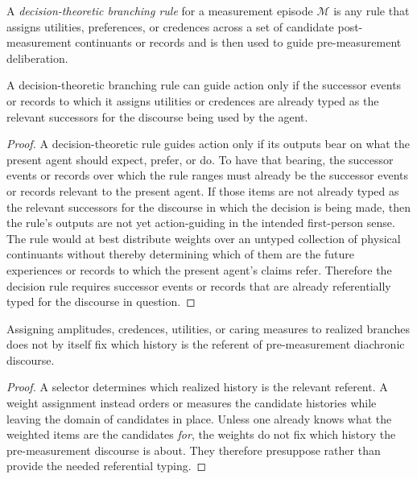 \begin{definition}
A \emph{decision-theoretic branching rule} for a measurement episode $\mathcal{M}$ is any rule that
assigns utilities, preferences, or credences across a set of candidate post-measurement continuants or
records and is then used to guide pre-measurement deliberation.
\end{definition}

\begin{lemma}
\label{lem:typed_successors}
A decision-theoretic branching rule can guide action only if the successor events or records to which it
assigns utilities or credences are already typed as the relevant successors for the discourse being used by
the agent.
\end{lemma}

\begin{proof}
A decision-theoretic rule guides action only if its outputs bear on what the present agent should expect,
prefer, or do. To have that bearing, the successor events or records over which the rule ranges must
already be the successor events or records relevant to the present agent. If those items are not already
typed as the relevant successors for the discourse in which the decision is being made, then the rule's
outputs are not yet action-guiding in the intended first-person sense. The rule would at best distribute
weights over an untyped collection of physical continuants without thereby determining which of them
are the future experiences or records to which the present agent's claims refer. Therefore the decision
rule requires successor events or records that are already referentially typed for the discourse in
question.
\end{proof}

\begin{proposition}
\label{prop:weightsnotselectors}
Assigning amplitudes, credences, utilities, or caring measures to realized branches does not by itself
fix which history is the referent of pre-measurement diachronic discourse.
\end{proposition}

\begin{proof}
A selector determines which realized history is the relevant referent. A weight assignment instead
orders or measures the candidate histories while leaving the domain of candidates in place. Unless one
already knows what the weighted items are the candidates \emph{for}, the weights do not fix which
history the pre-measurement discourse is about. They therefore presuppose rather than provide the
needed referential typing.
\end{proof}

